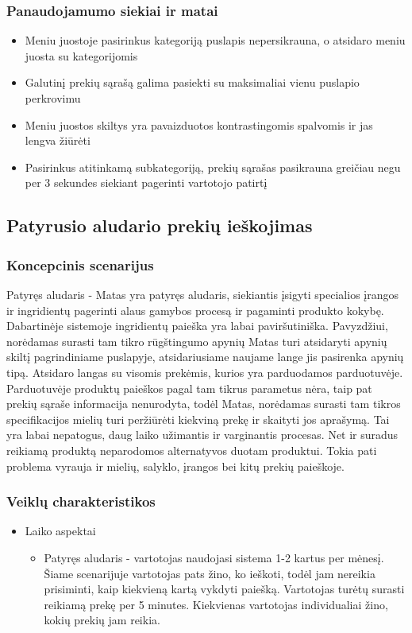 \documentclass[oneside]{VUMIFPSkursinis}
\begin{document}
		\subsubsection{Panaudojamumo siekiai ir matai}
			\begin{itemize}
				\item{Meniu juostoje pasirinkus kategoriją puslapis nepersikrauna, o atsidaro meniu juosta su kategorijomis}
				\item{Galutinį prekių sąrašą galima pasiekti su maksimaliai vienu puslapio perkrovimu}
				\item{Meniu juostos skiltys yra pavaizduotos kontrastingomis spalvomis ir jas lengva žiūrėti}
				\item{Pasirinkus atitinkamą subkategoriją, prekių sąrašas pasikrauna greičiau negu per 3 sekundes siekiant pagerinti vartotojo patirtį}
			\end{itemize}
	\subsection{Patyrusio aludario prekių ieškojimas}
		\subsubsection{Koncepcinis scenarijus}
			Patyręs aludaris - Matas yra patyręs aludaris, siekiantis įsigyti specialios įrangos ir ingridientų pagerinti alaus gamybos procesą ir pagaminti produkto kokybę.
			Dabartinėje sistemoje ingridientų paieška yra labai paviršutiniška.
			Pavyzdžiui, norėdamas surasti tam tikro rūgštingumo apynių Matas turi atsidaryti apynių skiltį pagrindiniame puslapyje, atsidariusiame naujame lange jis pasirenka apynių tipą.
			Atsidaro langas su visomis prekėmis, kurios yra parduodamos parduotuvėje.
			Parduotuvėje produktų paieškos pagal tam tikrus parametus nėra, taip pat prekių sąraše informacija nenurodyta, todėl Matas, norėdamas surasti tam tikros specifikacijos mielių turi peržiūrėti kiekviną prekę ir skaityti jos aprašymą.
			Tai yra labai nepatogus, daug laiko užimantis ir varginantis procesas.
			Net ir suradus reikiamą produktą neparodomos alternatyvos duotam produktui.
			Tokia pati problema vyrauja ir mielių, salyklo, įrangos bei kitų prekių paieškoje.
		\subsubsection{Veiklų charakteristikos}
			\begin{itemize}
				\item{Laiko aspektai}
					\begin{itemize}
						\item{
							Patyręs aludaris - vartotojas naudojasi sistema 1-2 kartus per mėnesį.
							Šiame scenarijuje vartotojas pats žino, ko ieškoti, todėl jam nereikia prisiminti, kaip kiekvieną kartą vykdyti paiešką.
							Vartotojas turėtų surasti reikiamą prekę per 5 minutes.
							Kiekvienas vartotojas individualiai žino, kokių prekių jam reikia.
						}
					\end{itemize}
			\end{itemize}
\end{document}
